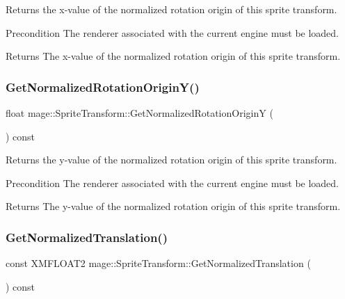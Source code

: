 Returns the x-\/value of the normalized rotation origin of this sprite transform.

\begin{DoxyPrecond}{Precondition}
The renderer associated with the current engine must be loaded. 
\end{DoxyPrecond}
\begin{DoxyReturn}{Returns}
The x-\/value of the normalized rotation origin of this sprite transform. 
\end{DoxyReturn}
\hypertarget{structmage_1_1_sprite_transform_a056e5e5ecfaa79a2ff57ce7ec9e47a30}{}\label{structmage_1_1_sprite_transform_a056e5e5ecfaa79a2ff57ce7ec9e47a30} 
\subsubsection{\texorpdfstring{Get\+Normalized\+Rotation\+Origin\+Y()}{GetNormalizedRotationOriginY()}}
{\footnotesize\ttfamily float mage\+::\+Sprite\+Transform\+::\+Get\+Normalized\+Rotation\+OriginY (\begin{DoxyParamCaption}{ }\end{DoxyParamCaption}) const}

Returns the y-\/value of the normalized rotation origin of this sprite transform.

\begin{DoxyPrecond}{Precondition}
The renderer associated with the current engine must be loaded. 
\end{DoxyPrecond}
\begin{DoxyReturn}{Returns}
The y-\/value of the normalized rotation origin of this sprite transform. 
\end{DoxyReturn}
\hypertarget{structmage_1_1_sprite_transform_a35b4a512d853e08743948f8065d1558f}{}\label{structmage_1_1_sprite_transform_a35b4a512d853e08743948f8065d1558f} 
\subsubsection{\texorpdfstring{Get\+Normalized\+Translation()}{GetNormalizedTranslation()}}
{\footnotesize\ttfamily const X\+M\+F\+L\+O\+A\+T2 mage\+::\+Sprite\+Transform\+::\+Get\+Normalized\+Translation (\begin{DoxyParamCaption}{ }\end{DoxyParamCaption}) const}

